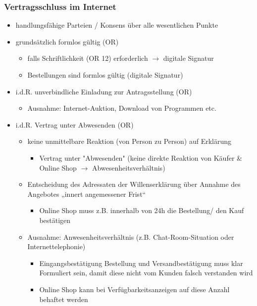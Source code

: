 \subsubsection{Vertragsschluss im Internet}
\begin{itemize}
    \item handlungsfähige Parteien / Konsens über alle wesentlichen Punkte
    \item grundsätzlich formlos gültig (OR)
    \begin{itemize}
        \item falls Schriftlichkeit (OR 12) erforderlich $\rightarrow$ digitale Signatur
        \item Bestellungen sind formlos gültig (digitale Signatur)
    \end{itemize}
    \item i.d.R. unverbindliche Einladung zur Antragsstellung (OR)
    \begin{itemize}
        \item Ausnahme: Internet-Auktion, Download von Programmen etc.
    \end{itemize}
    \item i.d.R. Vertrag unter Abwesenden (OR)
    \begin{itemize}
        \item keine unmittelbare Reaktion (von Person zu Person) auf Erklärung
        \begin{itemize}
            \item Vertrag unter "Abwesenden" (keine direkte Reaktion von Käufer \& Online Shop $\rightarrow$ Abwesenheitsverhältnis)
        \end{itemize}
        \item Entscheidung des Adressaten der Willenserklärung über Annahme des Angebotes „innert angemessener Frist“
        \begin{itemize}
            \item Online Shop muss z.B. innerhalb von 24h die Bestellung/ den Kauf bestätigen
        \end{itemize}
        \item Ausnahme: Anwesenheitsverhältnis (z.B. Chat-Room-Situation oder Internettelephonie)
        \begin{itemize}
            \item Eingangsbestätigung Bestellung und Versandbestätigung muss klar Formuliert sein, damit diese nicht vom Kunden falsch verstanden wird
            \item Online Shop kann bei Verfügbarkeitsanzeigen auf diese Anzahl behaftet werden
        \end{itemize}
    \end{itemize}
\end{itemize}

